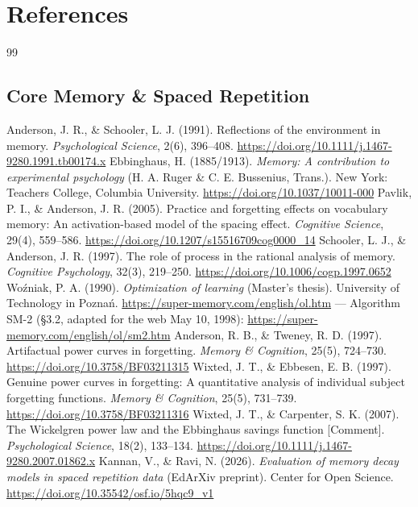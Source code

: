 \documentclass[11pt]{article}
\begin{document}
\section{References}
\begin{thebibliography}{99}
\subsection{Core Memory \& Spaced Repetition}
 Anderson, J. R., \& Schooler, L. J. (1991). Reflections of the environment in memory. \textit{Psychological Science}, 2(6), 396--408. \url{https://doi.org/10.1111/j.1467-9280.1991.tb00174.x}
 Ebbinghaus, H. (1885/1913). \textit{Memory: A contribution to experimental psychology} (H. A. Ruger \& C. E. Bussenius, Trans.). New York: Teachers College, Columbia University. \url{https://doi.org/10.1037/10011-000}
 Pavlik, P. I., \& Anderson, J. R. (2005). Practice and forgetting effects on vocabulary memory: An activation-based model of the spacing effect. \textit{Cognitive Science}, 29(4), 559--586. \url{https://doi.org/10.1207/s15516709cog0000_14}
 Schooler, L. J., \& Anderson, J. R. (1997). The role of process in the rational analysis of memory. \textit{Cognitive Psychology}, 32(3), 219--250. \url{https://doi.org/10.1006/cogp.1997.0652}
 Woźniak, P. A. (1990). \textit{Optimization of learning} (Master's thesis). University of Technology in Poznań. \url{https://super-memory.com/english/ol.htm} --- Algorithm SM-2 (\S3.2, adapted for the web May 10, 1998): \url{https://super-memory.com/english/ol/sm2.htm}
 Anderson, R. B., \& Tweney, R. D. (1997). Artifactual power curves in forgetting. \textit{Memory \& Cognition}, 25(5), 724--730. \url{https://doi.org/10.3758/BF03211315}
 Wixted, J. T., \& Ebbesen, E. B. (1997). Genuine power curves in forgetting: A quantitative analysis of individual subject forgetting functions. \textit{Memory \& Cognition}, 25(5), 731--739. \url{https://doi.org/10.3758/BF03211316}
 Wixted, J. T., \& Carpenter, S. K. (2007). The Wickelgren power law and the Ebbinghaus savings function [Comment]. \textit{Psychological Science}, 18(2), 133--134. \url{https://doi.org/10.1111/j.1467-9280.2007.01862.x}
 Kannan, V., \& Ravi, N. (2026). \textit{Evaluation of memory decay models in spaced repetition data} (EdArXiv preprint). Center for Open Science. \url{https://doi.org/10.35542/osf.io/5hqc9_v1}

\end{thebibliography}
\end{document}
